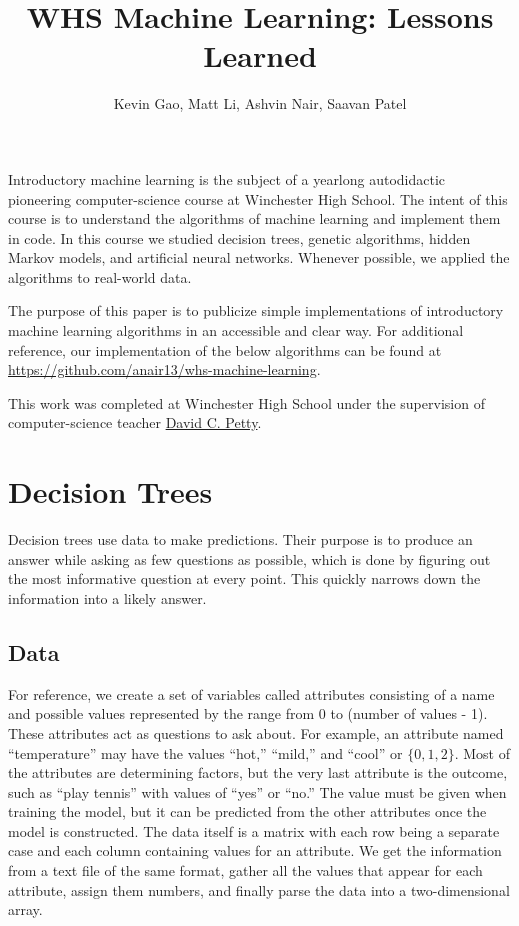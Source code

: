\documentclass[11pt,a4paper]{article}
\author{Kevin Gao, Matt Li, Ashvin Nair, Saavan Patel}
\title{WHS Machine Learning: Lessons Learned}
\begin{document}
\maketitle

Introductory machine learning is the subject of a yearlong autodidactic pioneering computer-science course at Winchester High School. The intent of this course is to understand the algorithms of machine learning and implement them in code. In this course we studied decision trees, genetic algorithms, hidden Markov models, and artificial neural networks. Whenever possible, we applied the algorithms to real-world data.

The purpose of this paper is to publicize simple implementations of introductory machine learning algorithms in an accessible and clear way. For additional reference, our implementation of the below algorithms can be found at \url{https://github.com/anair13/whs-machine-learning}.

This work was completed at Winchester High School under the supervision of computer-science teacher \href{http://winchester.k12.ma.us/~dpetty/}{David C. Petty}.

\section{Decision Trees}
\label{DecisionTrees}

Decision trees use data to make predictions. Their purpose is to produce an answer while asking as few questions as possible, which is done by figuring out the most informative question at every point. This quickly narrows down the information into a likely answer.

\subsection{Data}
\label{DecisionTrees:Data}

For reference, we create a set of variables called attributes consisting of a name and possible values represented by the range from 0 to (number of values - 1). These attributes act as questions to ask about. For example, an attribute named ``temperature'' may have the values ``hot,'' ``mild,'' and ``cool'' or $\{0, 1, 2\}$. Most of the attributes are determining factors, but the very last attribute is the outcome, such as ``play tennis'' with values of ``yes'' or ``no.'' The value must be given when training the model, but it can be predicted from the other attributes once the model is constructed. The data itself is a matrix with each row being a separate case and each column containing values for an attribute. We get the information from a text file of the same format, gather all the values that appear for each attribute, assign them numbers, and finally parse the data into a two-dimensional array.
\end{document}
